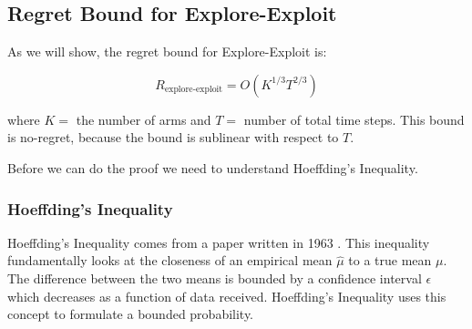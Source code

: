 \documentclass[11pt]{article}
\begin{document}
\subsection{Regret Bound for Explore-Exploit}

As we will show, the regret bound for Explore-Exploit is:

\begin{equation}
    R_{\text{explore-exploit}} = O(K^{1/3}T^{2/3})
\end{equation}

where $K =$ the number of arms and $T =$ number of total time steps. This bound is no-regret, because the bound is sublinear with respect to $T$. 

Before we can do the proof we need to understand Hoeffding's Inequality.

\subsubsection{Hoeffding's Inequality}

Hoeffding's Inequality comes from a paper written in 1963 \cite{10.2307/2282952}. This inequality fundamentally looks at the closeness of an empirical mean $\hat{\mu}$ to a true mean $\mu$. The difference between the two means is bounded by a confidence interval $\epsilon$ which decreases as a function of data received. Hoeffding's Inequality uses this concept to formulate a bounded probability. 
\end{document}
